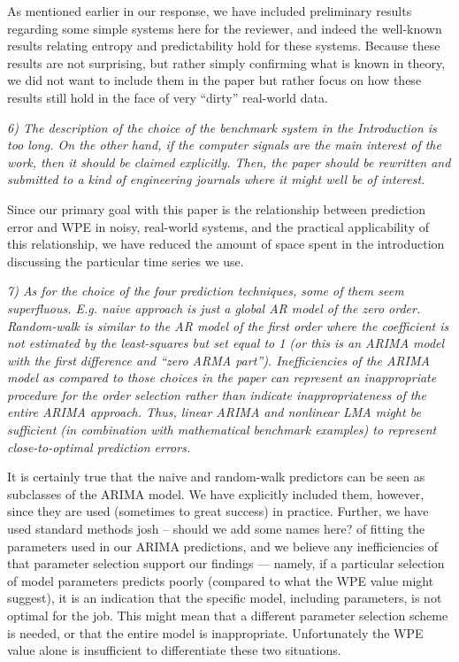 \documentclass[12pt]{article}
\newcommand{\alert}[1]{{\color{red}#1}}
\begin{document}
As mentioned earlier in our response, we have included preliminary results
regarding some simple systems here for the reviewer, and indeed the well-known
results relating entropy and predictability hold for these systems. Because
these results are not surprising, but rather simply confirming what is known in
theory, we did not want to include them in the paper but rather focus on how
these results still hold in the face of very ``dirty'' real-world data.

\emph{6) The description of the choice of the benchmark system in the
Introduction is too long. On the other hand, if the computer signals are the
main interest of the work, then it should be claimed explicitly. Then, the paper
should be rewritten and submitted to a kind of engineering journals where it
might well be of interest.}

Since our primary goal with this paper is the relationship between prediction
error and WPE in noisy, real-world systems, and the practical applicability of
this relationship, we have reduced the amount of space spent in the introduction
discussing the particular time series we use.

\emph{7) As for the choice of the four prediction techniques, some of them seem
superfluous. E.g. naive approach is just a global AR model of the zero order.
Random-walk is similar to the AR model of the first order where the coefficient
is not estimated by the least-squares but set equal to 1 (or this is an ARIMA
model with the first difference and ``zero ARMA part''). Inefficiencies of the
ARIMA model as compared to those choices in the paper can represent an
inappropriate procedure for the order selection rather than indicate
inappropriateness of the entire ARIMA approach. Thus, linear ARIMA and nonlinear
LMA might be sufficient (in combination with mathematical benchmark examples) to
represent close-to-optimal prediction errors.}

It is certainly true that the naive and random-walk predictors can be seen as
subclasses of the ARIMA model. We have explicitly included them, however, since
they are used (sometimes to great success) in practice. Further, we have used
standard methods \alert{josh -- should we add some names here?} of fitting the
parameters used in our ARIMA predictions, and we believe any inefficiencies of
that parameter selection support our findings --- namely, if a particular
selection of model parameters predicts poorly (compared to what the WPE value
might suggest), it is an indication that the specific model, including
parameters, is not optimal for the job. This might mean that a different
parameter selection scheme is needed, or that the entire model is inappropriate.
Unfortunately the WPE value alone is insufficient to differentiate these two
situations.
\end{document}
